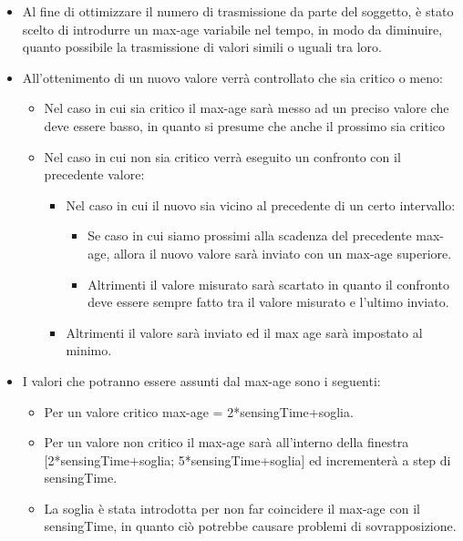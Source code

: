     \begin{itemize}
      \item Al fine di ottimizzare il numero di trasmissione da parte del soggetto, è stato scelto di introdurre un max-age variabile nel tempo, in modo da diminuire, quanto possibile la trasmissione di valori simili o uguali tra loro.
      \item All’ottenimento di un nuovo valore verrà controllato che sia critico o meno:

        \begin{itemize}
          \item Nel caso in cui sia critico il max-age sarà messo ad un preciso valore che deve essere basso, in quanto si presume che anche il prossimo sia critico
          \item Nel caso in cui non sia critico verrà eseguito un confronto con il precedente valore:

              \begin{itemize}
                \item Nel caso in cui il nuovo sia vicino al precedente di un certo intervallo:

                  \begin{itemize}
                    \item Se caso in cui siamo prossimi alla scadenza del precedente max-age, allora il nuovo valore sarà inviato con un max-age superiore.
                    \item Altrimenti il valore misurato sarà scartato in quanto il confronto deve essere sempre fatto tra il valore misurato e l’ultimo inviato.
                  \end{itemize}

                \item Altrimenti il valore sarà inviato ed il max age sarà impostato al minimo.
              \end{itemize}

        \end{itemize}

      \item I valori che potranno essere assunti dal max-age sono i seguenti:

        \begin{itemize}
          \item Per un valore critico max-age = 2*sensingTime+soglia.
          \item Per un valore non critico il max-age sarà all’interno della finestra [2*sensingTime+soglia; 5*sensingTime+soglia] ed incrementerà a step di sensingTime.
          \item La soglia è stata introdotta per non far coincidere il max-age con il sensingTime, in quanto ciò potrebbe causare problemi di sovrapposizione.
        \end{itemize}

    \end{itemize}

